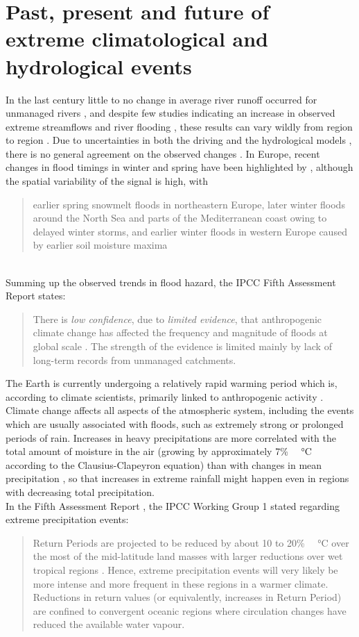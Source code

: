 \section{Past, present and future of extreme climatological and hydrological events} \label{sec:future_extremes}

In the last century little to no change in average river runoff occurred for unmanaged rivers \citep{Dai2016, Dai2009}, and despite few studies indicating an increase in observed extreme streamflows and river flooding \citep{Mallakpour2015, Stevens2016}, these results can vary wildly from region to region \citep[see e.g.][]{Do2017}. Due to uncertainties in both the driving and the hydrological models \citep{Gosling2017, Donnelly2017}, there is no general agreement on the observed changes \citep{Kundzewicz2012, Hall2014, Robson2002, Kundzewicz2010}. In Europe, recent changes in flood timings in winter and spring have been highlighted by \citet{Bloschl2017a}, although the spatial variability of the signal is high, with \blockquote{earlier spring snowmelt floods in northeastern Europe, later winter floods around the North Sea and parts of the Mediterranean coast owing to delayed winter storms, and earlier winter floods in western Europe caused by earlier soil moisture maxima}.\\
Summing up the observed trends in flood hazard, the IPCC Fifth Assessment Report \citep[][section 3.2.7]{IPCCAR5WG2_3} states:
\blockquote{There is \textit{low confidence}, due to \textit{limited evidence}, that anthropogenic
climate change has affected the frequency and magnitude of floods
at global scale \citep{Kundzewicz2013}. The strength of the evidence
is limited mainly by lack of long-term records from unmanaged
catchments.}.

The Earth is currently undergoing a relatively rapid warming period which is, according to climate scientists, primarily linked to anthropogenic activity \citep{Anderegg2010, IPCC2013}. Climate change affects all aspects of the atmospheric system, including the events which are usually associated with floods, such as extremely strong or prolonged periods of rain. Increases in heavy precipitations are more correlated with the total amount of moisture in the air (growing by approximately 7\% \SI{}{\per \celsius} according to the Clausius-Clapeyron equation) than with changes in mean precipitation \citep{Allen2002}, so that increases in extreme rainfall might happen even in regions with decreasing total precipitation.\\
In the Fifth Assessment Report \citep[][section 12.4.5.5]{IPCC2013}, the IPCC Working Group 1 stated regarding extreme precipitation events:
\blockquote{Return Periods are projected to be reduced by
about 10 to 20\% \SI{}{\per\celsius} over the most of the mid-latitude land masses with larger reductions over wet tropical regions \citep{Kharin2013}. Hence, extreme precipitation events will very likely be more intense and more frequent in these regions in a warmer climate. Reductions in return values (or equivalently, increases in Return Period) are confined to convergent oceanic regions where circulation changes have reduced the available water vapour.}

